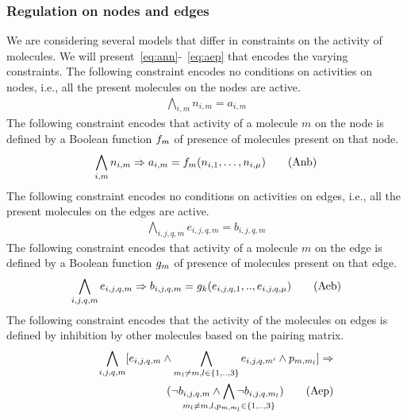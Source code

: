 \subsubsection{Regulation on nodes and edges}
We are considering several models that differ in constraints on
the activity of molecules.
%
We will present~\eqref{eq:ann}-~\eqref{eq:aep} that encodes
the varying constraints.
%
The following constraint encodes no conditions on activities on nodes,
i.e., all the present molecules on the nodes are active.
\begin{align}
\bigwedge\limits_{i,m} n_{i,m} = a_{i,m}    \tag{Ann}\label{eq:ann}
\end{align}
The following constraint encodes that activity of a molecule $m$ on the node is
defined by a Boolean function $f_m$ of presence of molecules present on that node.
\begin{align}
\bigwedge\limits_{i,m} n_{i,m} \Rightarrow a_{i,m} =  f_m (n_{i,1},\dots,n_{i,\mu}) 
\tag{Anb}\label{eq:anb}
\end{align}
The following constraint encodes no conditions on activities on edges,
i.e., all the present molecules on the edges are active.
\begin{align}
  \bigwedge\limits_{i,j,q,m} e_{i,j,q,m} = b_{i,j,q,m}
\tag{Aen}\label{eq:aen}
\end{align}
The following constraint encodes that activity of a molecule $m$ on the edge is
defined by a Boolean function $g_m$ of presence of molecules present on that edge.
\begin{align}
   \bigwedge\limits_{i,j,q,m} e_{i,j,q,m} \Rightarrow b_{i,j,q,m} = g_k(e_{i,j,q,1}, .., e_{i,j,q,\mu} )
  \tag{Aeb}\label{eq:aeb}
\end{align}
%
The following constraint encodes that the activity of the molecules on
edges is defined by inhibition by other molecules based on the pairing
matrix. 
\begin{align}
	\bigwedge\limits_{i,j,q, m}  [e_{i,j,q,m} \land \bigwedge_{m_l \neq m,l \in \{1,..,3\}} e_{i,j,q,m'} \land p_{m, m_l}] \limplies 
	\notag \\
	  \qquad \qquad \qquad \qquad
	(\neg b_{i,j,q,m} \land \bigwedge_{\mathclap{m_l \neq m,l, p_{m, m_l} \in \{1,..,3\}}} \neg b_{i,j,q,m_l})
  \tag{Aep}\label{eq:aep}
\end{align}
%
